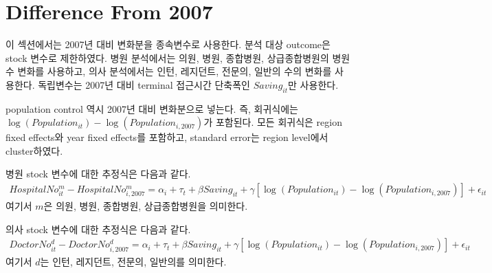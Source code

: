 \documentclass[a4paper, 10pt]{article}
\begin{document}
    \section{Difference From 2007}
        이 섹션에서는 2007년 대비 변화분을 종속변수로 사용한다. 분석 대상 outcome은
        stock 변수로 제한하였다. 병원 분석에서는 의원, 병원, 종합병원, 상급종합병원의
        병원 수 변화를 사용하고, 의사 분석에서는 인턴, 레지던트, 전문의, 일반의 수의
        변화를 사용한다. 독립변수는 2007년 대비 terminal 접근시간 단축폭인
        $Saving_{it}$만 사용한다.

        population control 역시 2007년 대비 변화분으로 넣는다. 즉, 회귀식에는
        $\log(Population_{it}) - \log(Population_{i,2007})$가 포함된다. 모든 회귀식은
        region fixed effects와 year fixed effects를 포함하고, standard error는 region
        level에서 cluster하였다.

        병원 stock 변수에 대한 추정식은 다음과 같다.
        \begin{align*}
            HospitalNo^m_{it} - HospitalNo^m_{i,2007}
            =
            \alpha_i + \tau_t
            + \beta Saving_{it}
            + \gamma \left[
                \log(Population_{it}) - \log(Population_{i,2007})
            \right]
            + \epsilon_{it}
        \end{align*}
        여기서 $m$은 의원, 병원, 종합병원, 상급종합병원을 의미한다.

        \begin{table}[H]
            \centering
            \caption{Difference From 2007, Travel-Time Saving: 병원 수}
            
        \end{table}

        의사 stock 변수에 대한 추정식은 다음과 같다.
        \begin{align*}
            DoctorNo^d_{it} - DoctorNo^d_{i,2007}
            =
            \alpha_i + \tau_t
            + \beta Saving_{it}
            + \gamma \left[
                \log(Population_{it}) - \log(Population_{i,2007})
            \right]
            + \epsilon_{it}
        \end{align*}
        여기서 $d$는 인턴, 레지던트, 전문의, 일반의를 의미한다.

        \begin{table}[H]
            \centering
            \caption{Difference From 2007, Travel-Time Saving: 의사 수}
            
        \end{table}
\end{document}
